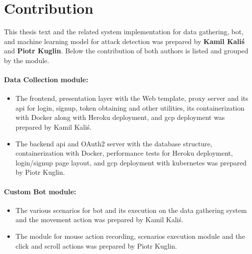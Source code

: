 \section{Contribution}\label{sec:contribution}
This thesis text and the related system implementation for data gathering, bot, and machine learning model for attack detection was prepared by \textbf{Kamil Kaliś} and \textbf{Piotr Kuglin}.
Below the contribution of both authors is listed and grouped by the module.

\begin{minipage}{\textwidth}
    \paragraph{Data Collection module:}
    \begin{itemize}[label=$\bullet$]
        \item The frontend, presentation layer with the Web template, proxy server and its \gls{api} for login, signup, token obtaining and other utilities, its containerization with Docker along with Heroku deployment, and \gls{gcp} deployment was prepared by Kamil Kaliś.
        \item The backend \gls{api} and OAuth2 server with the database structure, containerization with Docker, performance tests for Heroku deployment, login/signup page layout, and \gls{gcp} deployment with kubernetes was prepared by Piotr Kuglin.
    \end{itemize}
\end{minipage}

\begin{minipage}{\textwidth}
    \paragraph{Custom Bot module:}
    \begin{itemize}[label=$\bullet$]
        \item The various scenarios for bot and its execution on the data gathering system and the movement action was prepared by Kamil Kaliś.
        \item The module for mouse action recording, scenarios execution module and the click and scroll actions was prepared by Piotr Kuglin.
    \end{itemize}
\end{minipage}

